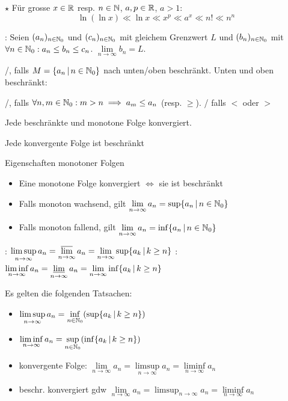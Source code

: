 \Satz $\star$ Für grosse $x \in \mathbb{R}$ resp. $n \in \mathbb{N}$, $a, p \in \mathbb{R}$, $a > 1$:
$$\ln(\ln x) \ll \ln x \ll x^p \ll a^x \ll n! \ll n^n$$

\Satz {}:
Seien $(a_n)_{n\in\mathbb{N}_0}$ und $(c_n)_{n\in\mathbb{N}_0}$ mit gleichem Grenzwert $L$ und
$(b_n)_{n\in\mathbb{N}_0}$ mit $\forall n \in \mathbb{N}_0 : a_n\le b_n\le c_n$. $\lim\limits_{n\to\infty} b_n = L$.

\Def {}/, falls $M = \{a_n \, | \, n \in \mathbb{N}_0\}$
nach unten/oben beschränkt. Unten und oben beschränkt: 

\Def {}/,
falls $\forall n,m \in \mathbb{N}_0 : m > n \implies a_m\le a_n$ (resp. $\geq$).
/ falls $<$ oder $>$

\Satz Jede beschränkte und monotone Folge konvergiert.

\Satz Jede konvergente Folge ist beschränkt

\Satz Eigenschaften monotoner Folgen
\vspace{-0.6em}
\begin{itemize}
    \item Eine monotone Folge konvergiert $\iff$ sie ist beschränkt
    \item Falls monoton wachsend, gilt $\lim\limits_{n\to\infty}a_n = \sup\{a_n \, | \, n \in \mathbb{N}_0\}$
    \item Falls monoton fallend, gilt $\lim\limits_{n\to\infty}a_n = \inf\{a_n \, | \, n \in \mathbb{N}_0\}$
\end{itemize}

\Def {}: $\limsup\limits_{n\to\infty} a_n = \varlimsup\limits_{n\to\infty} a_n = \lim\limits_{n\to\infty} \sup\{a_k \, | \, k\ge n\}$
: $\liminf\limits_{n\to\infty} a_n = \varliminf\limits_{n \to \infty} a_n = \lim\limits_{n\to\infty} \inf\{a_k \, | \, k\ge n\}$

\Satz Es gelten die folgenden Tatsachen:
\vspace{-0.6em}
\begin{itemize}
    \item $\limsup\limits_{n\to\infty} a_n = \inf\limits_{n\in\mathbb{N}_0}(\sup\{a_k \, | \, k\ge n\})$
    \item $\liminf\limits_{n\to\infty} a_n = \sup\limits_{n\in\mathbb{N}_0}(\inf\{a_k \, | \, k\ge n\})$
    \item konvergente Folge: $\lim\limits_{n\to\infty} a_n = \limsup\limits_{n\to\infty} a_n = \liminf\limits_{n\to\infty} a_n$
    \item beschr. konvergiert gdw $\lim\limits_{n\to\infty}a_n = \limsup_{n\to\infty} a_n = \liminf\limits_{n\to\infty} a_n$
\end{itemize}

